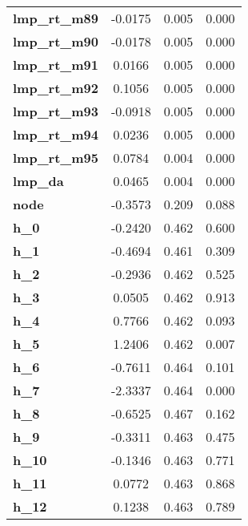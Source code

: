 \documentclass[conference]{IEEEtran}
\begin{document}
\begin{table}[htbp]
\begin{center}
\begin{tabular}{lccc}
\textbf{lmp\_rt\_m89}             &      -0.0175  &        0.005     & 0.000  \\
\textbf{lmp\_rt\_m90}             &      -0.0178  &        0.005     & 0.000  \\
\textbf{lmp\_rt\_m91}             &       0.0166  &        0.005     & 0.000  \\
\textbf{lmp\_rt\_m92}             &       0.1056  &        0.005     & 0.000  \\
\textbf{lmp\_rt\_m93}             &      -0.0918  &        0.005     & 0.000  \\
\textbf{lmp\_rt\_m94}             &       0.0236  &        0.005     & 0.000  \\
\textbf{lmp\_rt\_m95}             &       0.0784  &        0.004     & 0.000  \\
\textbf{lmp\_da}                  &       0.0465  &        0.004     & 0.000  \\
\textbf{node}                     &      -0.3573  &        0.209     & 0.088  \\
\textbf{h\_0}                     &      -0.2420  &        0.462     & 0.600  \\
\textbf{h\_1}                     &      -0.4694  &        0.461     & 0.309  \\
\textbf{h\_2}                     &      -0.2936  &        0.462     & 0.525  \\
\textbf{h\_3}                     &       0.0505  &        0.462     & 0.913  \\
\textbf{h\_4}                     &       0.7766  &        0.462     & 0.093  \\
\textbf{h\_5}                     &       1.2406  &        0.462     & 0.007  \\
\textbf{h\_6}                     &      -0.7611  &        0.464     & 0.101  \\
\textbf{h\_7}                     &      -2.3337  &        0.464     & 0.000  \\
\textbf{h\_8}                     &      -0.6525  &        0.467     & 0.162  \\
\textbf{h\_9}                     &      -0.3311  &        0.463     & 0.475  \\
\textbf{h\_10}                    &      -0.1346  &        0.463     & 0.771  \\
\textbf{h\_11}                    &       0.0772  &        0.463     & 0.868  \\
\textbf{h\_12}                    &       0.1238  &        0.463     & 0.789  \\

\end{tabular}
\end{center}
\end{table}
\end{document}
